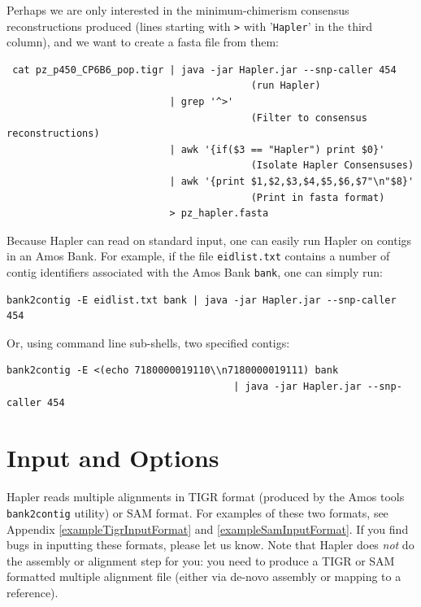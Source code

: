 \documentclass[11pt]{llncs}
\begin{document}
Perhaps we are only interested in the minimum-chimerism consensus reconstructions produced (lines starting with \texttt{>} with '\texttt{Hapler}' in the third column), and we want to create a fasta file from them:

\begin{verbatim}
 cat pz_p450_CP6B6_pop.tigr | java -jar Hapler.jar --snp-caller 454   
                                          (run Hapler)
                            | grep '^>'
                                          (Filter to consensus reconstructions)
                            | awk '{if($3 == "Hapler") print $0}'     
                                          (Isolate Hapler Consensuses)
                            | awk '{print $1,$2,$3,$4,$5,$6,$7"\n"$8}' 
                                          (Print in fasta format)
                            > pz_hapler.fasta
\end{verbatim}


\newpage
Because Hapler can read on standard input, one can easily run Hapler on contigs in an Amos Bank. 
For example, if the file \texttt{eidlist.txt} contains a number of contig identifiers
associated with the Amos Bank \texttt{bank}, one can simply run:

\begin{verbatim}
bank2contig -E eidlist.txt bank | java -jar Hapler.jar --snp-caller 454
\end{verbatim}

Or, using command line sub-shells, two specified contigs:

\begin{verbatim}
bank2contig -E <(echo 7180000019110\\n7180000019111) bank 
                                       | java -jar Hapler.jar --snp-caller 454
\end{verbatim}



\newpage

\section{Input and Options}
\label{inputAndOptions}

Hapler reads multiple alignments in TIGR format (produced by the Amos tools \verb=bank2contig= utility) or SAM format. For examples of these two 
formats, see Appendix \ref{exampleTigrInputFormat} and \ref{exampleSamInputFormat}. If you find bugs in inputting these formats, please let us know. 
Note that Hapler does \emph{not} do the assembly or alignment step for you: you need to produce a TIGR or SAM formatted multiple alignment file 
(either via de-novo assembly or mapping to a reference).
\end{document}
